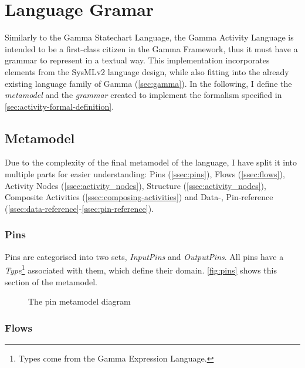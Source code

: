 \clearpage\section{Language Gramar}\label{sec:activity-grammar}

Similarly to the Gamma Statechart Language, the Gamma Activity Language is intended to be a first-class citizen in the Gamma Framework, thus it must have a grammar to represent in a textual way. This implementation incorporates elements from the SysMLv2 \cite{omg_sysml_v2} language design, while also fitting into the already existing language family of Gamma (\autoref{sec:gamma}). In the following, I define the \emph{metamodel} and the \emph{grammar} created to implement the formalism specified in \autoref{sec:activity-formal-definition}.

\subsection{Metamodel}

Due to the complexity of the final metamodel of the language, I have split it into multiple parts for easier understanding: Pins (\autoref{ssec:pins}), Flows (\autoref{ssec:flows}), Activity Nodes  (\autoref{ssec:activity_nodes}), Structure (\autoref{ssec:activity_nodes}), Composite Activities (\autoref{ssec:composing-activities}) and Data-, Pin-reference (\autoref{ssec:data-reference}-\autoref{ssec:pin-reference}).

\subsubsection*{Pins}\label{ssec:pins}

Pins are categorised into two sets, \emph{InputPins} and \emph{OutputPins}. All pins have a \emph{Type}\footnote{Types come from the Gamma Expression Language.} associated with them, which define their domain. \autoref{fig:pins} shows this section of the metamodel.

\begin{figure}[!ht]
	\centering
	
	\caption{The pin metamodel diagram}
	\label{fig:pins}
\end{figure}

\subsubsection*{Flows}\label{ssec:flows}

